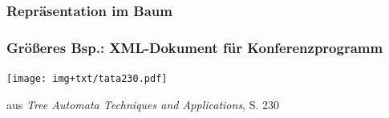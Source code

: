     \begin{frame}
      \frametitle{Repräsentation im Baum}
      
      \hspace*{\fill}
      \Bsp
      \par\bigskip\bigskip
      \begin{center}
      \end{center}

    \end{frame}

    \begin{frame}
      \frametitle{Größeres Bsp.: XML-Dokument für Konferenzprogramm}
      
      \begin{minipage}[b]{.6\textwidth}
        \begin{exampleblock}{}
          \texttt{[image: img+txt/tata230.pdf]}
        \end{exampleblock}
      \end{minipage}
      \hfill
      \begin{minipage}[b]{.37\textwidth}
        \begin{footnotesize}
          aus \emph{Tree Automata Techniques and Applications}, S. 230
          \par
        \end{footnotesize}
      \end{minipage}


    \end{frame}

